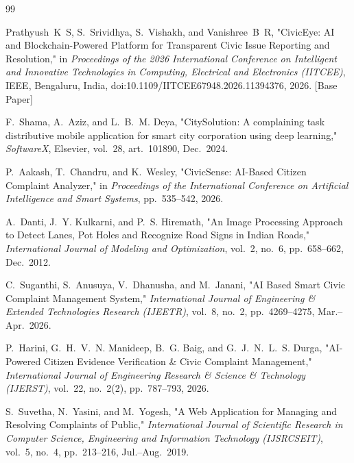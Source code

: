 \documentclass[12pt,a4paper]{report}
\begin{document}
\begin{thebibliography}{99}
\sloppy

Prathyush~K~S, S.~Srividhya, S.~Vishakh, and Vanishree~B~R, "CivicEye: AI and Blockchain-Powered Platform for Transparent Civic Issue Reporting and Resolution," in \textit{Proceedings of the 2026 International Conference on Intelligent and Innovative Technologies in Computing, Electrical and Electronics (IITCEE)}, IEEE, Bengaluru, India, doi:10.1109/IITCEE67948.2026.11394376, 2026. [Base Paper]

F.~Shama, A.~Aziz, and L.~B.~M. Deya, "CitySolution: A complaining task distributive mobile application for smart city corporation using deep learning," \textit{SoftwareX}, Elsevier, vol.~28, art.~101890, Dec.~2024.

P.~Aakash, T.~Chandru, and K.~Wesley, "CivicSense: AI-Based Citizen Complaint Analyzer," in \textit{Proceedings of the International Conference on Artificial Intelligence and Smart Systems}, pp.~535--542, 2026.

A.~Danti, J.~Y. Kulkarni, and P.~S. Hiremath, "An Image Processing Approach to Detect Lanes, Pot Holes and Recognize Road Signs in Indian Roads," \textit{International Journal of Modeling and Optimization}, vol.~2, no.~6, pp.~658--662, Dec.~2012.

C.~Suganthi, S.~Anusuya, V.~Dhanusha, and M.~Janani, "AI Based Smart Civic Complaint Management System," \textit{International Journal of Engineering \& Extended Technologies Research (IJEETR)}, vol.~8, no.~2, pp.~4269--4275, Mar.--Apr.~2026.

P.~Harini, G.~H.~V.~N. Manideep, B.~G. Baig, and G.~J.~N.~L.~S. Durga, "AI-Powered Citizen Evidence Verification \& Civic Complaint Management," \textit{International Journal of Engineering Research \& Science \& Technology (IJERST)}, vol.~22, no.~2(2), pp.~787--793, 2026.

S.~Suvetha, N.~Yasini, and M.~Yogesh, "A Web Application for Managing and Resolving Complaints of Public," \textit{International Journal of Scientific Research in Computer Science, Engineering and Information Technology (IJSRCSEIT)}, vol.~5, no.~4, pp.~213--216, Jul.--Aug.~2019.


\end{thebibliography}
\end{document}
